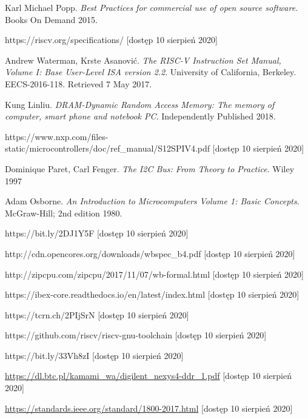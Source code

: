 \documentclass[11pt,a4paper]{article}
\begin{document}
\begin{thebibliography}{10}

	 Karl Michael Popp. \textit{Best Practices for commercial use of open source software}. Books On Demand  2015.
	
	 https://riscv.org/specifications/ [dostęp 10 sierpień 2020]
	
	 Andrew Waterman, Krste Asanović. \textit{The RISC-V Instruction Set Manual, Volume I: Base User-Level ISA version 2.2}. University of California, Berkeley. EECS-2016-118. Retrieved 7 May 2017.
	
	 Kung Linliu. \textit{DRAM-Dynamic Random Access Memory: The memory of computer, smart phone and notebook PC}. Independently Published 2018.
	
	 https://www.nxp.com/files-static/microcontrollers/doc/ref\_manual/S12SPIV4.pdf [dostęp 10 sierpień 2020]
	
	 	Dominique Paret, Carl Fenger. \textit{The I2C Bus: From Theory to Practice}. Wiley 1997 
	
	 Adam Osborne. \textit{An Introduction to Microcomputers Volume 1: Basic Concepts}. McGraw-Hill; 2nd edition 1980.
	
	 https://bit.ly/2DJ1Y5F [dostęp 10 sierpień 2020]
	
	 http://cdn.opencores.org/downloads/wbspec\_b4.pdf [dostęp 10 sierpień 2020]
	
	 http://zipcpu.com/zipcpu/2017/11/07/wb-formal.html [dostęp 10 sierpień 2020]
	
	 https://ibex-core.readthedocs.io/en/latest/index.html [dostęp 10 sierpień 2020]
	
	 https://tcrn.ch/2PIjSrN [dostęp 10 sierpień 2020]

	 https://github.com/riscv/riscv-gnu-toolchain [dostęp 10 sierpień 2020]
	
	 https://bit.ly/33Vh8zI [dostęp 10 sierpień 2020]
	
	 \url{https://dl.btc.pl/kamami\_wa/digilent\_nexys4-ddr\_1.pdf} [dostęp 10 sierpień 2020]
	
	 \url{https://standards.ieee.org/standard/1800-2017.html} [dostęp 10 sierpień 2020]

\end{thebibliography}
\end{document}

